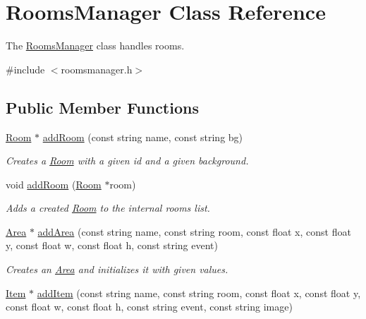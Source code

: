 \hypertarget{classRoomsManager}{
\section{RoomsManager Class Reference}
\label{classRoomsManager}
}


The \hyperlink{classRoomsManager}{RoomsManager} class handles rooms.  




{\ttfamily \#include $<$roomsmanager.h$>$}

\subsection*{Public Member Functions}
\begin{DoxyCompactItemize}
\item 
\hypertarget{classRoomsManager_a7c35b5ec2dabfe1438097992e5f1a9f8}{
\hyperlink{classRoom}{Room} $\ast$ \hyperlink{classRoomsManager_a7c35b5ec2dabfe1438097992e5f1a9f8}{addRoom} (const string name, const string bg)}
\label{classRoomsManager_a7c35b5ec2dabfe1438097992e5f1a9f8}

\begin{DoxyCompactList}\small\item\em Creates a \hyperlink{classRoom}{Room} with a given id and a given background. \item\end{DoxyCompactList}\item 
\hypertarget{classRoomsManager_ab3f71b7397fab7ce99cf1f6b53e58df4}{
void \hyperlink{classRoomsManager_ab3f71b7397fab7ce99cf1f6b53e58df4}{addRoom} (\hyperlink{classRoom}{Room} $\ast$room)}
\label{classRoomsManager_ab3f71b7397fab7ce99cf1f6b53e58df4}

\begin{DoxyCompactList}\small\item\em Adds a created \hyperlink{classRoom}{Room} to the internal rooms list. \item\end{DoxyCompactList}\item 
\hypertarget{classRoomsManager_a1a077e2c4ebf6319352242221c38f26a}{
\hyperlink{classArea}{Area} $\ast$ \hyperlink{classRoomsManager_a1a077e2c4ebf6319352242221c38f26a}{addArea} (const string name, const string room, const float x, const float y, const float w, const float h, const string event)}
\label{classRoomsManager_a1a077e2c4ebf6319352242221c38f26a}

\begin{DoxyCompactList}\small\item\em Creates an \hyperlink{classArea}{Area} and initializes it with given values. \item\end{DoxyCompactList}\item 
\hypertarget{classRoomsManager_ab40803ff0befab1d64964b478ce06c99}{
\hyperlink{classItem}{Item} $\ast$ \hyperlink{classRoomsManager_ab40803ff0befab1d64964b478ce06c99}{addItem} (const string name, const string room, const float x, const float y, const float w, const float h, const string event, const string image)}
\label{classRoomsManager_ab40803ff0befab1d64964b478ce06c99}


\end{DoxyCompactItemize}
